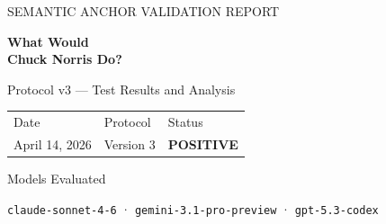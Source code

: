\documentclass[10.5pt,a4paper]{article}
\begin{document}
\thispagestyle{empty}
\pagecolor{navy}

\vspace*{3.5cm}

\begin{center}
{\color{white}\fontsize{9}{11}\selectfont\lightfont{}SEMANTIC ANCHOR VALIDATION REPORT}

\vspace{0.6cm}

{\color{white}\serifheading\fontsize{32}{38}\selectfont\bfseries
What Would\\[4pt]Chuck Norris Do?}

\vspace{0.5cm}

{\color{white!70}\fontsize{14}{18}\selectfont\lightfont
Protocol v3 — Test Results and Analysis}

\vspace{2.8cm}


\vspace{1.2cm}

\begin{tabular}{C{4cm} C{4cm} C{4cm}}
{\color{white!50}\lightfont\small Date} &
{\color{white!50}\lightfont\small Protocol} &
{\color{white!50}\lightfont\small Status} \\[4pt]
{\color{white}\normalsize April 14, 2026} &
{\color{white}\normalsize Version 3} &
{\color{passgreen}\normalsize\bfseries POSITIVE} \\
\end{tabular}

\vspace{1.8cm}


\vspace{1.0cm}

{\color{white!60}\small\lightfont Models Evaluated}

\vspace{0.3cm}

{\color{white}\normalsize
\texttt{claude-sonnet-4-6}
\quad·\quad
\texttt{gemini-3.1-pro-preview}
\quad·\quad
\texttt{gpt-5.3-codex}}
\end{center}
\end{document}
